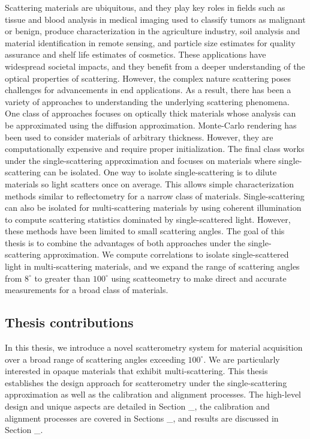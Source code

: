 Scattering materials are ubiquitous, and they play key roles in fields such as tissue and blood analysis in medical imaging used to classify tumors as malignant or benign, produce characterization in the agriculture industry, soil analysis and material identification in remote sensing, and particle size estimates for quality assurance and shelf life estimates of cosmetics. These applications have widespread societal impacts, and they benefit from a deeper understanding of the optical properties of scattering. However, the complex nature scattering poses challenges for advancements in end applications. As a result, there has been a variety of approaches to understanding the underlying scattering phenomena. One class of approaches focuses on optically thick materials whose analysis can be approximated using the diffusion approximation. Monte-Carlo rendering has been used to consider materials of arbitrary thickness. However, they are computationally expensive and require proper initialization. The final class works under the single-scattering approximation and focuses on materials where single-scattering can be isolated. One way to isolate single-scattering is to dilute materials so light scatters once on average. This allows simple characterization methods similar to reflectometry for a narrow class of materials. Single-scattering can also be isolated for multi-scattering materials by using coherent illumination to compute scattering statistics dominated by single-scattered light. However, these methods have been limited to small scattering angles. The goal of this thesis is to combine the advantages of both approaches under the single-scattering approximation. We compute correlations to isolate single-scattered light in multi-scattering materials, and we expand the range of scattering angles from $8^\circ$ to greater than $100^\circ$ using scatteometry to make direct and accurate measurements for a broad class of materials.

\subsection{Thesis contributions}
In this thesis, we introduce a novel scatterometry system for material acquisition over a broad range of scattering angles exceeding $100^\circ$. We are particularly interested in opaque materials that exhibit multi-scattering. This thesis establishes the design approach for scatterometry under the single-scattering approximation as well as the calibration and alignment processes. The high-level design and unique aspects are detailed in Section \_, the calibration and alignment processes are covered in Sections \_, and results are discussed in Section \_.

